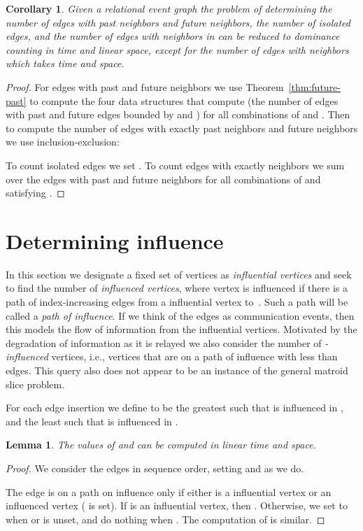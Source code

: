 \documentclass[11pt]{article}
\newtheorem{lemma}{Lemma}
\newtheorem{corollary}{Corollary}
\begin{document}
\begin{corollary}
Given a relational event graph  the problem of determining the number of edges with  past neighbors and  future neighbors, the number of isolated edges, and the number of edges with  neighbors in  can be reduced to dominance counting in  time and linear space, except for the number of edges with  neighbors which takes  time and space.
\end{corollary}
\begin{proof}
For edges with past and future neighbors we use Theorem~\ref{thm:future-past} to compute the four data structures that compute  (the number of edges with past and future edges bounded by  and ) for all combinations of  and . Then to compute the number of edges with exactly  past neighbors and  future neighbors we use inclusion-exclusion:

To count isolated edges we set . To count edges with exactly  neighbors we sum over the edges with  past and  future neighbors for all combinations of  and  satisfying .
\end{proof}


\section{Determining influence}
In this section we designate a fixed set of vertices as \emph{influential vertices} and seek to find the number of \emph{influenced vertices}, where vertex  is influenced if there is a path of index-increasing edges from a influential vertex to~. Such a path will be called a \emph{path of influence}. If we think of the edges as communication events, then this models the flow of information from the influential vertices. Motivated by the degradation of information as it is relayed we also consider the number of \emph{-influenced} vertices, i.e., vertices that are on a path of influence with less than  edges. This query also does not appear to be an instance of the general matroid slice problem.

For each edge insertion  we define  to be the greatest  such that  is influenced in , and  the least  such that  is influenced in .

\begin{lemma}\label{lem:influence}
The values of  and  can be computed in linear time and space.
\end{lemma}
\begin{proof}
We consider the edges  in sequence order, setting  and  as we do.

The edge  is on a path on influence only if either  is a influential vertex or an influenced vertex ( is set). If  is an influential vertex, then . Otherwise, we set  to  when  or  is unset, and do nothing when . The computation of  is similar.
\end{proof}
\end{document}
